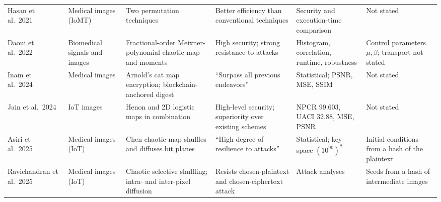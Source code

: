 \begin{table}
\begin{tabular}{@{}R{2.5cm}R{1.9cm}R{4.5cm}R{3.7cm}R{3.1cm}R{3.3cm}@{}}
Hasan et al.\ 2021~\cite{hasan2021lightweight} & Medical images (IoMT) & Two permutation techniques & Better efficiency than conventional techniques & Security and execution-time comparison & Not stated \\
Daoui et al.\ 2022~\cite{daoui2022meixner} & Biomedical signals and images & Fractional-order Meixner-polynomial chaotic map and moments & High security; strong resistance to attacks & Histogram, correlation, runtime, robustness & Control parameters $\mu,\beta$; transport not stated \\
Inam et al.\ 2024~\cite{inam2024arnold} & Medical images & Arnold's cat map encryption; blockchain-anchored digest & ``Surpass all previous endeavors'' & Statistical; PSNR, MSE, SSIM & Not stated \\
Jain et al.\ 2024~\cite{jain2024mmcbie} & IoT images & Henon and 2D logistic maps in combination & High-level security; superiority over existing schemes & NPCR 99.603, UACI 32.88, MSE, PSNR & Not stated \\
Asiri et al.\ 2025~\cite{asiri2025bitplane} & Medical images (IoT) & Chen chaotic map shuffles and diffuses bit planes & ``High degree of resilience to attacks'' & Statistical; key space $(10^{90})^8$ & Initial conditions from a hash of the plaintext \\
Ravichandran et al.\ 2025~\cite{ravichandran2025shuffling} & Medical images (IoT) & Chaotic selective shuffling; intra- and inter-pixel diffusion & Resists chosen-plaintext and chosen-ciphertext attack & Attack analyses & Seeds from a hash of intermediate images \\
\bottomrule
\end{tabular}
\end{table}

